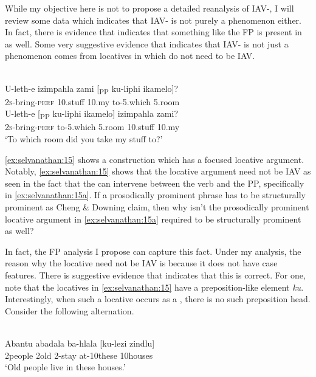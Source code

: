 \documentclass[output=paper
,newtxmath
,modfonts
,nonflat]{langsci/langscibook}
\begin{document}
While my objective here is not to propose a detailed reanalysis of  IAV-, I will review some data which indicates that  IAV- is not purely a  phenomenon either. In fact, there is evidence that indicates that something like the FP is present in  as well. Some very suggestive evidence that indicates that  IAV- is not just a  phenomenon comes from locatives in  which do not need to be IAV. 

\ea\label{ex:selvanathan:15}
 \citep[168]{Buell2009}\\
\ea\label{ex:selvanathan:15a}
	\gll U-leth-e      izimpahla  zami   [\textsubscript{PP} ku-liphi      ikamelo]? \\
	2\textsc{s}{}-bring-\textsc{perf}  10.stuff   10.my   {}     to-5.which   5.room\\
	
\ex\label{ex:selvanathan:15b}
	\gll U-leth-e          [\textsubscript{PP} ku-liphi   ikamelo]   izimpahla  zami?\\
	2\textsc{s}{}-bring-\textsc{perf}   {}   to-5.which   5.room     10.stuff     10.my\\
	\glt `To which room did you take my stuff to?'
\z
\z

\ref{ex:selvanathan:15} shows a construction which has a focused locative argument. Notably, \ref{ex:selvanathan:15} shows that the locative argument need not be IAV as seen in the fact that the  can intervene between the verb and the PP, specifically in \ref{ex:selvanathan:15a}. If a prosodically prominent phrase has to be structurally prominent as Cheng \& Downing claim, then why isn't the prosodically prominent locative argument in \ref{ex:selvanathan:15a} required to be structurally prominent as well? 

In fact, the FP analysis I propose can capture this fact. Under my analysis, the reason why the locative need not be IAV is because it does not have case features. There is suggestive evidence that indicates that this is correct. For one, note that the locatives in \ref{ex:selvanathan:15} have a preposition-like element \textit{ku}. Interestingly, when such a locative occurs as a , there is no such preposition head. Consider the following alternation.

\ea\label{ex:selvanathan:16}
 \citep[107]{Buell2007}\\
\ea\label{ex:selvanathan:16a}
\gll Abantu  abadala  ba-hlala  [ku-lezi   zindlu] \\
2people   2old     2-stay   at-10these   10houses\\
\glt `Old people live in these houses.' 
\end{document}
